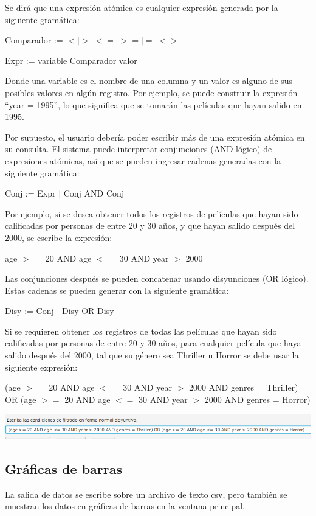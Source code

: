 \documentclass{article}
\begin{document}
Se dirá que una expresión atómica es cualquier expresión generada por la siguiente gramática:

Comparador := $< | > | <= | >= | = | <>$

Expr := variable Comparador valor

Donde una variable es el nombre de una columna y un valor es alguno de sus posibles valores en algún registro. Por ejemplo, se puede construir la expresión ``year = 1995'', lo que significa que se tomarán las películas que hayan salido en 1995.

Por supuesto, el usuario debería poder escribir más de una expresión atómica en su consulta. El sistema puede interpretar conjunciones (AND lógico) de expresiones atómicas, así que se pueden ingresar cadenas generadas con la siguiente gramática:

Conj := Expr $|$ Conj AND Conj

Por ejemplo, si se desea obtener todos los registros de películas que hayan sido calificadas por personas de entre 20 y 30 años, y que hayan salido después del 2000, se escribe la expresión:

age $>=$ 20 AND age $<=$ 30 AND year $>$ 2000

Las conjunciones después se pueden concatenar usando disyunciones (OR lógico). Estas cadenas se pueden generar con la siguiente gramática:

Disy := Conj $|$ Disy OR Disy

Si se requieren obtener los registros de todas las películas que hayan sido calificadas por personas de entre 20 y 30 años, para cualquier película que haya salido después del 2000, tal que su género sea Thriller u Horror se debe usar la siguiente expresión:

(age $>=$ 20 AND age $<=$ 30 AND year $>$ 2000 AND genres = Thriller) OR (age $>=$ 20 AND age $<=$ 30 AND year $>$ 2000 AND genres = Horror)

\includegraphics[width=\linewidth]{condicion}

\subsection{Gráficas de barras}

La salida de datos se escribe sobre un archivo de texto csv, pero también se muestran los datos en gráficas de barras en la ventana principal.
\end{document}
